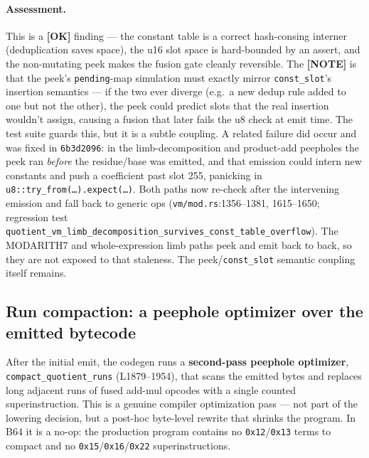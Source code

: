 \paragraph{Assessment.} This is a
\textcolor{tracegreen}{\textbf{[OK]}} finding --- the constant
table is a correct hash-consing interner (deduplication saves
space), the u16 slot space is hard-bounded by an assert, and the
non-mutating peek makes the fusion gate cleanly reversible. The
\textcolor{mathpurple}{\textbf{[NOTE]}} is that the peek's
\texttt{pending}-map simulation must exactly mirror
\texttt{const\_slot}'s insertion semantics --- if the two ever
diverge (e.g.\ a new dedup rule added to one but not the other),
the peek could predict slots that the real insertion wouldn't
assign, causing a fusion that later fails the u8 check at emit
time. The test suite guards this, but it is a subtle coupling.
 A related failure did occur and was fixed in
\texttt{6b3d2096}: in the limb-decomposition and product-add
peepholes the peek ran \emph{before} the residue/base was emitted,
and that emission could intern new constants and push a
coefficient past slot 255, panicking in
\texttt{u8::try\_\allowbreak{}from(\ldots).expect(\ldots)}. Both paths now
re-check after the intervening emission and fall back to generic
ops (\texttt{vm/mod.rs}:1356--1381, 1615--1650; regression test
\texttt{quotient\_\allowbreak{}vm\_\allowbreak{}limb\_\allowbreak{}decomposition\_\allowbreak{}survives\_\allowbreak{}const\_\allowbreak{}table\_\allowbreak{}overflow}).
The MODARITH7 and whole-expression limb paths peek and emit back
to back, so they are not exposed to that staleness. The
peek/\texttt{const\_slot} semantic coupling itself remains.

\subsection{Run compaction: a peephole optimizer over the emitted bytecode}
\label{sec:pr-run-compaction}

After the initial emit, the codegen runs a \textbf{second-pass
peephole optimizer}, \texttt{compact\_\allowbreak{}quotient\_\allowbreak{}runs}
(L1879--1954), that scans the emitted bytes and replaces long
adjacent runs of fused add-mul opcodes with a single counted
superinstruction. This is a genuine compiler optimization pass
--- not part of the lowering decision, but a post-hoc byte-level
rewrite that shrinks the program. In B64 it is a no-op: the
production program contains no \texttt{0x12}/\texttt{0x13} terms
to compact and no \texttt{0x15}/\texttt{0x16}/\texttt{0x22}
superinstructions.

